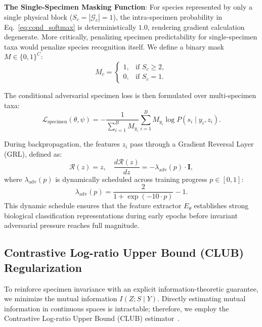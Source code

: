 \documentclass[a4paper,fleqn]{cas-sc}
\begin{document}
\noindent \textbf{The Single-Specimen Masking Function}: For species represented by only a single physical block ($S_c = |\mathcal{G}_c| = 1$), the intra-specimen probability in Eq.~\eqref{eq:cond_softmax} is deterministically $1.0$, rendering gradient calculation degenerate. More critically, penalizing specimen predictability for single-specimen taxa would penalize species recognition itself. We define a binary mask $M \in \{0, 1\}^C$:
\begin{equation}
    M_c = \begin{cases}
        1, & \text{if } S_c \ge 2, \\
        0, & \text{if } S_c = 1.
    \end{cases}
    \label{eq:mask}
\end{equation}

The conditional adversarial specimen loss is then formulated over multi-specimen taxa:
\begin{equation}
    \mathcal{L}_{\text{specimen}}(\theta, \psi) = -\frac{1}{\sum_{i=1}^B M_{y_i}} \sum_{i=1}^B M_{y_i} \log P(s_i \mid y_i, z_i).
    \label{eq:loss_specimen}
\end{equation}

During backpropagation, the features $z_i$ pass through a Gradient Reversal Layer (GRL), defined as:
\begin{equation}
    \mathcal{R}(z) = z, \quad \frac{d\mathcal{R}(z)}{dz} = -\lambda_{\text{adv}}(p) \cdot \mathbf{I},
    \label{eq:grl}
\end{equation}
where $\lambda_{\text{adv}}(p)$ is dynamically scheduled across training progress $p \in [0, 1]$:
\begin{equation}
    \lambda_{\text{adv}}(p) = \frac{2}{1 + \exp(-10 \cdot p)} - 1.
    \label{eq:lambda_schedule}
\end{equation}
This dynamic schedule ensures that the feature extractor $E_\theta$ establishes strong biological classification representations during early epochs before invariant adversarial pressure reaches full magnitude.

\subsection{Contrastive Log-ratio Upper Bound (CLUB) Regularization}
To reinforce specimen invariance with an explicit information-theoretic guarantee, we minimize the mutual information $I(Z; S \mid Y)$. Directly estimating mutual information in continuous spaces is intractable; therefore, we employ the Contrastive Log-ratio Upper Bound (CLUB) estimator~\cite{cheng2020club}.
\end{document}
